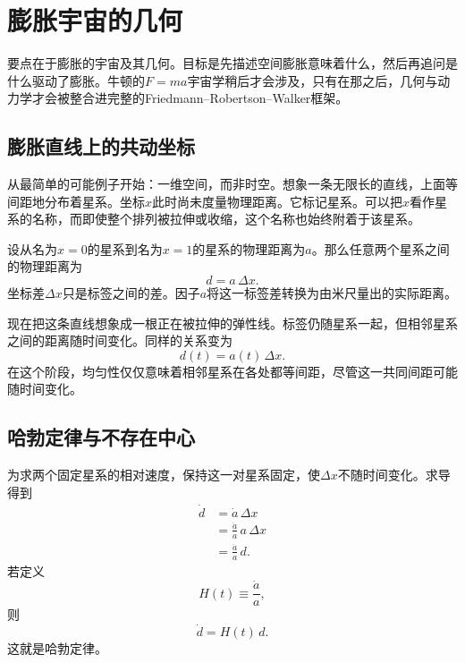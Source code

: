 \chapter{膨胀宇宙的几何}

要点在于膨胀的宇宙及其几何。目标是先描述空间膨胀意味着什么，然后再追问是什么驱动了膨胀。牛顿的\(F=ma\)宇宙学稍后才会涉及，只有在那之后，几何与动力学才会被整合进完整的Friedmann--Robertson--Walker框架。

\section{膨胀直线上的共动坐标}

从最简单的可能例子开始：一维空间，而非时空。想象一条无限长的直线，上面等间距地分布着星系。坐标\(x\)此时尚未度量物理距离。它标记星系。可以把\(x\)看作星系的名称，而即使整个排列被拉伸或收缩，这个名称也始终附着于该星系。

设从名为\(x=0\)的星系到名为\(x=1\)的星系的物理距离为\(a\)。那么任意两个星系之间的物理距离为
\begin{equation}
d=a\,\Delta x.
\end{equation}
坐标差\(\Delta x\)只是标签之间的差。因子\(a\)将这一标签差转换为由米尺量出的实际距离。

现在把这条直线想象成一根正在被拉伸的弹性线。标签仍随星系一起，但相邻星系之间的距离随时间变化。同样的关系变为
\begin{equation}
d(t)=a(t)\,\Delta x.
\end{equation}
在这个阶段，均匀性仅仅意味着相邻星系在各处都等间距，尽管这一共同间距可能随时间变化。

\section{哈勃定律与不存在中心}

为求两个固定星系的相对速度，保持这一对星系固定，使\(\Delta x\)不随时间变化。求导得到
\begin{align}
\dot d &= \dot a\,\Delta x \\
       &= \frac{\dot a}{a}\,a\,\Delta x \\
       &= \frac{\dot a}{a}\,d.
\end{align}
若定义
\begin{equation}
H(t)\equiv \frac{\dot a}{a},
\end{equation}
则
\begin{equation}
\dot d = H(t)\,d.
\end{equation}
这就是哈勃定律。

